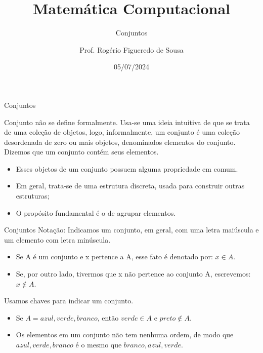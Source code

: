 \documentclass[aspectratio=169]{beamer}
\title{Matemática Computacional}
\subtitle{Conjuntos}
\author{Prof. Rogério Figueredo de Sousa}
\institute{%
\href{rogerio.sousa@ifpi.edu.br}{rogerio.sousa@ifpi.edu.br}%
}%
\date{05/07/2024}
\begin{document}
\begin{frame}[plain]
    \titlepage
\end{frame}




\jsonp
{}

\begin{frame}{Conjuntos}

    Conjunto não se define formalmente. Usa-se uma ideia intuitiva de que se trata de uma coleção de objetos, logo, informalmente, um conjunto é uma coleção desordenada
    de zero ou mais objetos, denominados elementos do conjunto. Dizemos que um conjunto contém seus elementos.

    \begin{itemize}
        \item Esses objetos de um conjunto possuem alguma propriedade em comum.
        \item Em geral, trata-se de uma estrutura discreta, usada para construir outras estruturas;
        \item O propósito fundamental é o de agrupar elementos.
    \end{itemize}

\end{frame}

\begin{frame}{Conjuntos}
    Notação: Indicamos um conjunto, em geral, com uma letra maiúscula e um elemento com letra minúscula.

    \begin{itemize}
        \item Se A é um conjunto e x pertence a A, esse fato é denotado por: $x \in A$.
        \item Se, por outro lado, tivermos que x não pertence ao conjunto A, escrevemos: $x \notin A$.
    \end{itemize}

    \vspace{2mm}
    Usamos chaves para indicar um conjunto.
    \begin{itemize}
        \item Se $A = {azul, verde, branco}$, então $verde \in A$ e $preto \notin A$.
        \item Os elementos em um conjunto não tem nenhuma ordem, de modo que ${azul, verde, branco}$ é o mesmo que ${branco, azul, verde}$.
    \end{itemize}    

\end{frame}
\end{document}
